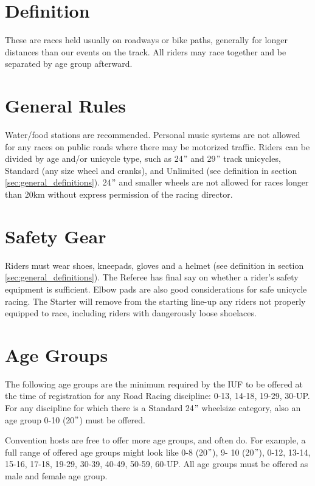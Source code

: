 
\section{Definition} %
These are races held usually on roadways or bike paths, generally for longer distances than our events on the track.
All riders may race together and be separated by age group afterward.

\section{General Rules}
Water/food stations are recommended.
Personal music systems are not allowed for any races on public roads where there may be motorized traffic.
Riders can be divided by age and/or unicycle type, such as 24$"$ and 29$"$ track unicycles, Standard (any size wheel and cranks), and Unlimited (see definition in section \ref{sec:general_definitions}).
24$"$ and smaller wheels are not allowed for races longer than 20km without express permission of the racing director.

\section{Safety Gear}
Riders must wear shoes, kneepads, gloves and a helmet (see definition in section \ref{sec:general_definitions}).
The Referee has final say on whether a rider’s safety equipment is sufficient.
Elbow pads are also good considerations for safe unicycle racing.
The Starter will remove from the starting line-up any riders not properly equipped to race, including riders with dangerously loose shoelaces.

\section{Age Groups}
The following age groups are the minimum required by the IUF to be offered at the time of registration for any Road Racing discipline: 0-13, 14-18, 19-29, 30-UP.
For any discipline for which there is a Standard 24$"$ wheelsize category, also an age group 0-10 (20$"$) must be offered.

Convention hosts are free to offer more age groups, and often do.
For example, a full range of offered age groups might look like 0-8 (20$"$), 9- 10 (20$"$), 0-12, 13-14, 15-16, 17-18, 19-29, 30-39, 40-49, 50-59, 60-UP.
All age groups must be offered as male and female age group.

